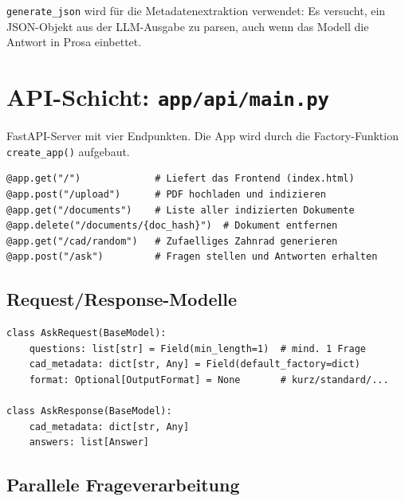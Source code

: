 \documentclass[12pt, a4paper]{article}
\begin{document}
\texttt{generate\_json} wird für die Metadatenextraktion verwendet: Es versucht,
ein JSON-Objekt aus der LLM-Ausgabe zu parsen, auch wenn das Modell die Antwort
in Prosa einbettet.

\newpage
\section{API-Schicht: \texttt{app/api/main.py}}

FastAPI-Server mit vier Endpunkten. Die App wird durch die Factory-Funktion
\texttt{create\_app()} aufgebaut.

\begin{lstlisting}[style=pythonstyle, caption={API-Endpunkte (Uebersicht)}]
@app.get("/")             # Liefert das Frontend (index.html)
@app.post("/upload")      # PDF hochladen und indizieren
@app.get("/documents")    # Liste aller indizierten Dokumente
@app.delete("/documents/{doc_hash}")  # Dokument entfernen
@app.get("/cad/random")   # Zufaelliges Zahnrad generieren
@app.post("/ask")         # Fragen stellen und Antworten erhalten
\end{lstlisting}

\subsection{Request/Response-Modelle}

\begin{lstlisting}[style=pythonstyle, caption={Pydantic-Modelle fuer /ask}]
class AskRequest(BaseModel):
    questions: list[str] = Field(min_length=1)  # mind. 1 Frage
    cad_metadata: dict[str, Any] = Field(default_factory=dict)
    format: Optional[OutputFormat] = None       # kurz/standard/...

class AskResponse(BaseModel):
    cad_metadata: dict[str, Any]
    answers: list[Answer]
\end{lstlisting}

\subsection{Parallele Frageverarbeitung}
\end{document}
